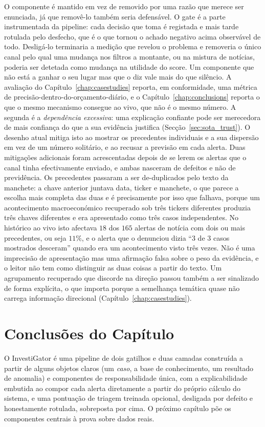 O componente é mantido em vez de removido por uma razão que merece ser enunciada, já que removê-lo
também seria defensável. O gate é a parte instrumentada da pipeline: cada decisão que toma é registada
e mais tarde rotulada pelo desfecho, que é o que tornou o achado negativo acima observável de todo.
Desligá-lo terminaria a medição que revelou o problema e removeria o único canal pelo qual uma mudança
nos filtros a montante, ou na mistura de notícias, poderia ser detetada como mudança na utilidade do
score. Um componente que não está a ganhar o seu lugar mas que o diz vale mais do que silêncio. A
avaliação do Capítulo~\ref{chap:casestudies} reporta, em conformidade, uma métrica de
precisão-dentro-do-orçamento-diário, e o Capítulo~\ref{chap:conclusions} reporta o que o mesmo
mecanismo consegue ao vivo, que não é o mesmo número. A segunda é a \emph{dependência excessiva}: uma explicação confiante pode ser
merecedora de mais confiança do que a sua evidência justifica (Secção~\ref{sec:sota_trust}). O desenho atual
mitiga isto ao mostrar os precedentes individuais e a sua dispersão em vez de um número solitário, e ao
recusar a previsão em cada alerta. Duas mitigações adicionais foram acrescentadas depois de se lerem os
alertas que o canal tinha efectivamente enviado, e ambas nasceram de defeitos e não de previdência. Os
precedentes passaram a ser de-duplicados pelo texto da manchete: a chave anterior juntava data, ticker e
manchete, o que parece a escolha mais completa das duas e é precisamente por isso que falhava, porque um
acontecimento macroeconómico recuperado sob três tickers diferentes produzia três chaves diferentes e era
apresentado como três casos independentes. No histórico ao vivo isto afectava $18$ dos $165$ alertas de
notícia com dois ou mais precedentes, ou seja $11\%$, e o alerta que o denunciou dizia ``$3$ de $3$ casos
mostrados desceram'' quando era um acontecimento visto três vezes. Não é uma imprecisão de apresentação
mas uma afirmação falsa sobre o peso da evidência, e o leitor não tem como distinguir as duas coisas a
partir do texto. Um agrupamento recuperado que discorde na direção passou também a ser sinalizado de
forma explícita, o que importa porque a semelhança temática quase não carrega informação direcional
(Capítulo~\ref{chap:casestudies}).

\section{Conclusões do Capítulo}
\label{sec:investigator_summary}

O InvestiGator é uma pipeline de dois gatilhos e duas camadas construída a partir de alguns objetos claros (um
\emph{caso}, a base de conhecimento, um resultado de anomalia) e componentes de responsabilidade única, com
a explicabilidade embutida ao compor cada alerta diretamente a partir do próprio cálculo do sistema, e uma
pontuação de triagem treinada opcional, desligada por defeito e honestamente rotulada, sobreposta por cima.
O próximo capítulo põe os componentes centrais à prova sobre dados reais.
